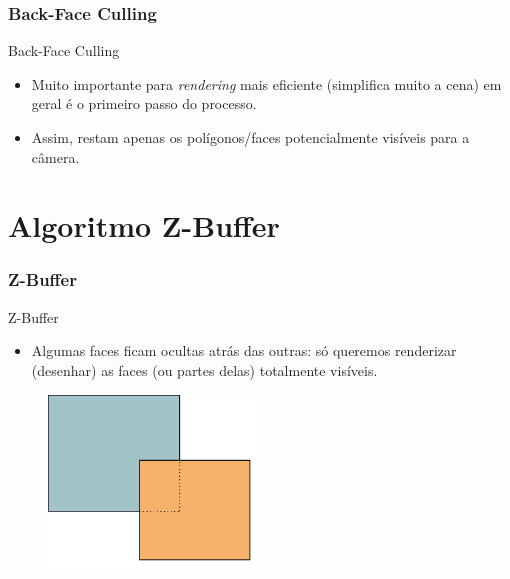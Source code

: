\documentclass{beamer}
\begin{document}
\begin{frame}
\frametitle{Back-Face Culling}

		\begin{block}{Back-Face Culling}
			\begin{itemize}	
				\item Muito importante para \textit{rendering} mais eficiente (simplifica muito a cena) em geral é o primeiro passo do processo.
			\end{itemize}
		\end{block}

		\begin{block}{}
			\begin{itemize}
				\item Assim, restam apenas os polígonos/faces potencialmente visíveis para a câmera.
			\end{itemize}
		\end{block}
\end{frame}


\section{Algoritmo Z-Buffer}
\begin{frame}
\frametitle{Z-Buffer}

		\begin{block}{Z-Buffer}
			\begin{itemize}	
				\item Algumas faces ficam ocultas atrás das outras: só queremos renderizar (desenhar) as faces (ou partes delas) totalmente visíveis.
			\end{itemize}
		\end{block}

		\begin{figure}[!h]
			\begin{center}
				\includegraphics[width=0.5\textwidth]{Figures/Cam}
			\end{center}
		\end{figure}

\end{frame}
\end{document}
